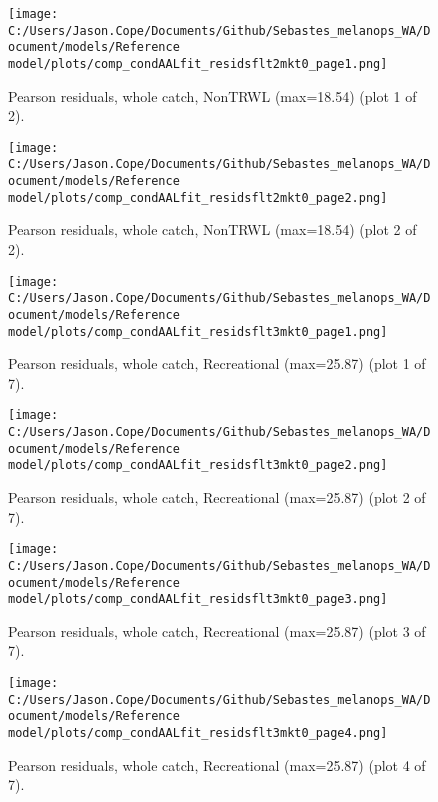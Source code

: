 \documentclass[11pt,
  english,
  letterpaper,
]{article}
\begin{document}
\begin{figure}
\centering
\texttt{[image: C:/Users/Jason.Cope/Documents/Github/Sebastes\_melanops\_WA/Document/models/Reference model/plots/comp\_condAALfit\_residsflt2mkt0\_page1.png]}
\caption{Pearson residuals, whole catch, NonTRWL (max=18.54) (plot 1 of 2).\label{fig:comp_condAALfit_residsflt2mkt0_page1}}
\end{figure}

\begin{figure}
\centering
\texttt{[image: C:/Users/Jason.Cope/Documents/Github/Sebastes\_melanops\_WA/Document/models/Reference model/plots/comp\_condAALfit\_residsflt2mkt0\_page2.png]}
\caption{Pearson residuals, whole catch, NonTRWL (max=18.54) (plot 2 of 2).\label{fig:comp_condAALfit_residsflt2mkt0_page2}}
\end{figure}

\begin{figure}
\centering
\texttt{[image: C:/Users/Jason.Cope/Documents/Github/Sebastes\_melanops\_WA/Document/models/Reference model/plots/comp\_condAALfit\_residsflt3mkt0\_page1.png]}
\caption{Pearson residuals, whole catch, Recreational (max=25.87) (plot 1 of 7).\label{fig:comp_condAALfit_residsflt3mkt0_page1}}
\end{figure}

\begin{figure}
\centering
\texttt{[image: C:/Users/Jason.Cope/Documents/Github/Sebastes\_melanops\_WA/Document/models/Reference model/plots/comp\_condAALfit\_residsflt3mkt0\_page2.png]}
\caption{Pearson residuals, whole catch, Recreational (max=25.87) (plot 2 of 7).\label{fig:comp_condAALfit_residsflt3mkt0_page2}}
\end{figure}

\begin{figure}
\centering
\texttt{[image: C:/Users/Jason.Cope/Documents/Github/Sebastes\_melanops\_WA/Document/models/Reference model/plots/comp\_condAALfit\_residsflt3mkt0\_page3.png]}
\caption{Pearson residuals, whole catch, Recreational (max=25.87) (plot 3 of 7).\label{fig:comp_condAALfit_residsflt3mkt0_page3}}
\end{figure}

\begin{figure}
\centering
\texttt{[image: C:/Users/Jason.Cope/Documents/Github/Sebastes\_melanops\_WA/Document/models/Reference model/plots/comp\_condAALfit\_residsflt3mkt0\_page4.png]}
\caption{Pearson residuals, whole catch, Recreational (max=25.87) (plot 4 of 7).\label{fig:comp_condAALfit_residsflt3mkt0_page4}}
\end{figure}
\end{document}
